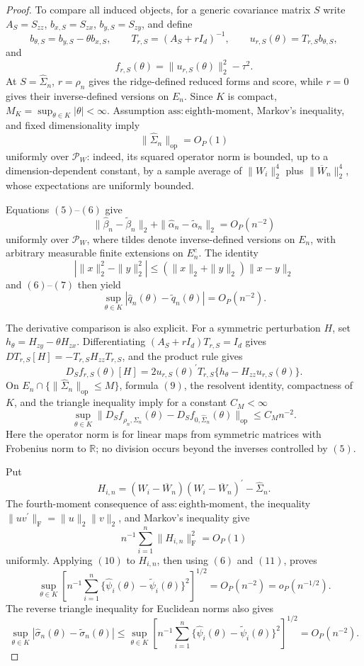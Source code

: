 \documentclass{article}
\begin{document}
\begin{proof}
To compare all induced objects, for a generic covariance matrix \(S\) write \(A_S=S_{zz}\), \(b_{x,S}=S_{zx}\), \(b_{y,S}=S_{zy}\), and define
\[
 b_{\theta,S}=b_{y,S}-\theta b_{x,S},\qquad
 T_{r,S}=(A_S+rI_d)^{-1},\qquad
 u_{r,S}(\theta)=T_{r,S}b_{\theta,S},
\]
and
\[
 f_{r,S}(\theta)=\|u_{r,S}(\theta)\|_2^2-\tau^2.
\]
At \(S=\widehat\Sigma_n\), \(r=\rho_n\) gives the ridge-defined reduced forms and score, while \(r=0\) gives their inverse-defined versions on \(E_n\). Since \(K\) is compact, \(M_K=\sup_{\theta\in K}|\theta|<\infty\). Assumption \(\mathrm{ass:eighth\mbox{-}moment}\), Markov's inequality, and fixed dimensionality imply
\[
 \|\widehat\Sigma_n\|_{\mathrm{op}}=O_P(1) \tag{6}
\]
uniformly over \(\mathcal P_W\): indeed, its squared operator norm is bounded, up to a dimension-dependent constant, by a sample average of \(\|W_i\|_2^4\) plus \(\|\overline W_n\|_2^4\), whose expectations are uniformly bounded.

Equations \((5)\)--\((6)\) give
\[
 \|\widehat\beta_n-\widetilde\beta_n\|_2
 +\|\widehat\alpha_n-\widetilde\alpha_n\|_2
 =O_P(n^{-2}) \tag{7}
\]
uniformly over \(\mathcal P_W\), where tildes denote inverse-defined versions on \(E_n\), with arbitrary measurable finite extensions on \(E_n^c\). The identity
\[
 |\|x\|_2^2-\|y\|_2^2|
 \leq (\|x\|_2+\|y\|_2)\|x-y\|_2
\]
and \((6)\)--\((7)\) then yield
\[
 \sup_{\theta\in K}|\widehat q_n(\theta)-\widetilde q_n(\theta)|=O_P(n^{-2}). \tag{8}
\]

The derivative comparison is also explicit. For a symmetric perturbation \(H\), set \(h_\theta=H_{zy}-\theta H_{zx}\). Differentiating \((A_S+rI_d)T_{r,S}=I_d\) gives \(D T_{r,S}[H]=-T_{r,S}H_{zz}T_{r,S}\), and the product rule gives
\[
 D_Sf_{r,S}(\theta)[H]
 =2u_{r,S}(\theta)^{\prime}T_{r,S}
   \{h_\theta-H_{zz}u_{r,S}(\theta)\}. \tag{9}
\]
On \(E_n\cap\{\|\widehat\Sigma_n\|_{\mathrm{op}}\leq M\}\), formula \((9)\), the resolvent identity, compactness of \(K\), and the triangle inequality imply for a constant \(C_M<\infty\)
\[
 \sup_{\theta\in K}
 \|D_Sf_{\rho_n,\widehat\Sigma_n}(\theta)
      -D_Sf_{0,\widehat\Sigma_n}(\theta)\|_{\mathrm{op}}
 \leq C_Mn^{-2}. \tag{10}
\]
Here the operator norm is for linear maps from symmetric matrices with Frobenius norm to \(\mathbb R\); no division occurs beyond the inverses controlled by \((5)\).

Put
\[
 H_{i,n}=(W_i-\overline W_n)(W_i-\overline W_n)^{\prime}-\widehat\Sigma_n.
\]
The fourth-moment consequence of \(\mathrm{ass:eighth\mbox{-}moment}\), the inequality \(\|uv^{\prime}\|_{\mathrm F}=\|u\|_2\|v\|_2\), and Markov's inequality give
\[
 n^{-1}\sum_{i=1}^n\|H_{i,n}\|_{\mathrm F}^2=O_P(1) \tag{11}
\]
uniformly. Applying \((10)\) to \(H_{i,n}\), then using \((6)\) and \((11)\), proves
\[
 \sup_{\theta\in K}
 \left[n^{-1}\sum_{i=1}^n
   \{\widehat\psi_i(\theta)-\widetilde\psi_i(\theta)\}^2
 \right]^{1/2}
 =O_P(n^{-2})=o_P(n^{-1/2}). \tag{12}
\]
The reverse triangle inequality for Euclidean norms also gives
\[
 \sup_{\theta\in K}|\widehat\sigma_n(\theta)-\widetilde\sigma_n(\theta)|
 \leq
 \sup_{\theta\in K}
 \left[n^{-1}\sum_{i=1}^n
   \{\widehat\psi_i(\theta)-\widetilde\psi_i(\theta)\}^2
 \right]^{1/2}
 =O_P(n^{-2}). \tag{13}
\]


\end{proof}
\end{document}
